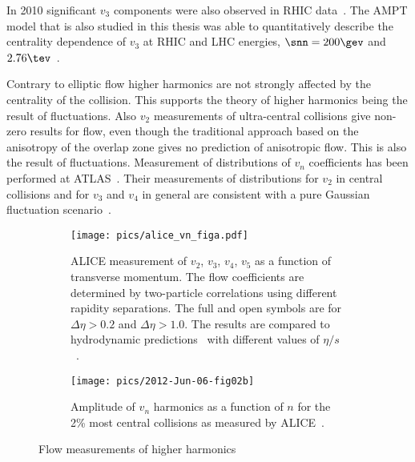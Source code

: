 In 2010 significant $v_3$ components were also observed in RHIC data~\cite{Alver:2010gr}. The AMPT model that is also studied in this thesis was able to quantitatively describe the centrality dependence of $v_3$ at RHIC and LHC energies, $\snn=200 \gev$ and $2.76\tev$~\cite{Xu:2011fe}.


Contrary to elliptic flow higher harmonics are not strongly affected by the centrality of the collision. This supports the theory of higher harmonics being the result of fluctuations. Also $v_2$ measurements of ultra-central collisions give non-zero results for flow, even though the traditional approach based on the anisotropy of the overlap zone gives no prediction of anisotropic flow. This is also the result of fluctuations. Measurement of distributions of $v_n$ coefficients has been performed at ATLAS~\cite{Jia:2012ve}. Their measurements of distributions for $v_2$ in central collisions and for $v_3$ and $v_4$ in general are consistent with a pure Gaussian fluctuation scenario~\cite{Jia:2012ve}.

\begin{figure}[tb]
	\centering
	\begin{subfigure}[t]{0.5\textwidth}
                \texttt{[image: pics/alice\_vn\_figa.pdf]}
        \caption[ALICE measurement of $v_2$, $v_3$, $v_4$, $v_5$]{ALICE measurement of $v_2$, $v_3$, $v_4$, $v_5$ as a function of transverse momentum. The flow coefficients are determined by two-particle correlations using different rapidity separations. 
        The full and open symbols are for $\Delta\eta > 0.2$ and $\Delta\eta > 1.0$. 
        The results are compared to hydrodynamic predictions~\cite{Schenke:2011tv} with different values of $\eta/s$~\cite{PRL107032301}.}
        \label{fig:higherharmonics}
        \end{subfigure}
        \quad
        \begin{subfigure}[t]{0.45\textwidth}
        \texttt{[image: pics/2012-Jun-06-fig02b]}
        \caption{Amplitude of $v_n$ harmonics as a function of $n$ for the 2\% most central collisions as  measured by ALICE~\cite{Aamodt2012249}.}
        \label{fig:alicepowers}

        \end{subfigure} 
        
                \caption[Flow measurements of higher harmonics]{Flow measurements of higher harmonics}
                \label{fig:vnpowers}

\end{figure}

